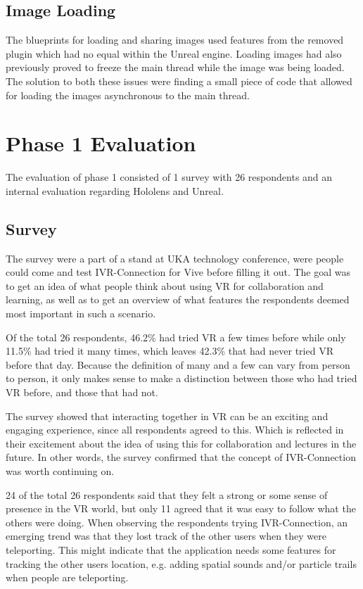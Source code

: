         \subsection{Image Loading}
        The blueprints for loading and sharing images used features from the removed plugin which had no equal within the Unreal engine. Loading images had also previously proved to freeze the main thread while the image was being loaded. The solution to both these issues were finding a small piece of code that allowed for loading the images asynchronous to the main thread. %
    
    
    \section{Phase 1 Evaluation} %
    The evaluation of phase 1 consisted of 1 survey with 26 respondents and an internal evaluation regarding Hololens and Unreal.
    
        \subsection{Survey} %
        The survey were a part of a stand at UKA technology conference, were people could come and test IVR-Connection for Vive before filling it out. The goal was to get an idea of what people think about using VR for collaboration and learning, as well as to get an overview of what features the respondents deemed most important in such a scenario.
        
        Of the total 26 respondents, 46.2\% had tried VR a few times before while only 11.5\% had tried it many times, which leaves 42.3\% that had never tried VR before that day. Because the definition of many and a few can vary from person to person, it only makes sense to make a distinction between those who had tried VR before, and those that had not.
        
        The survey showed that interacting together in VR can be an exciting and engaging experience, since all respondents agreed to this. Which is reflected in their excitement about the idea of using this for collaboration and lectures in the future. In other words, the survey confirmed that the concept of IVR-Connection was worth continuing on.
        
        24 of the total 26 respondents said that they felt a strong or some sense of presence in the VR world, but only 11 agreed that it was easy to follow what the others were doing. When observing the respondents trying IVR-Connection, an emerging trend was that they lost track of the other users when they were teleporting. This might indicate that the application needs some features for tracking the other users location, e.g. adding spatial sounds and/or particle trails when people are teleporting.
        
